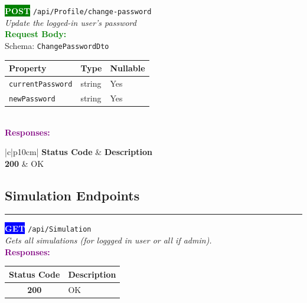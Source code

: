 \begin{tcolorbox}[
    colback=green!5,
    colframe=green,
    arc=2mm,
    boxrule=1pt,
    left=5pt,
    right=5pt,
    top=5pt,
    bottom=5pt
]
\noindent\colorbox{green}{\textcolor{white}{\textbf{POST}}} 
\texttt{\large /api/Profile/change-password}\\[0.3em]
\textit{Update the logged-in user's password}\\[0.3em]
\vspace{0.3em}
\textbf{\textcolor{green}{Request Body:}}\\[0.2em]
Schema: \texttt{ChangePasswordDto}\\[0.3em]
\begin{tabular}{|l|l|l|}
\hline
\rowcolor{green!10}
\textbf{Property} & \textbf{Type} & \textbf{Nullable} \\ \hline
\texttt{currentPassword} & string & Yes \\ \hline
\rowcolor{gray!5}
\texttt{newPassword} & string & Yes \\ \hline
\end{tabular}\\[0.5em]
\vspace{0.3em}
\textbf{\textcolor{purple}{Responses:}}\\[0.2em]
\begin{tabular}{|c|p{10cm}|}
\hline
{}
\textbf{Status Code} & \textbf{Description} \\ \hline
\colorbox{green!20}{\textbf{200}} & OK \\ \hline
\end{tabular}
\end{tcolorbox}
\vspace{0.5em}

\subsection{Simulation Endpoints}

\noindent\textcolor{gray!60}{\rule{\linewidth}{0.5pt}}
\vspace{0.5em}

\begin{tcolorbox}[
    colback=blue!5,
    colframe=blue,
    arc=2mm,
    boxrule=1pt,
    left=5pt,
    right=5pt,
    top=5pt,
    bottom=5pt
]
\noindent\colorbox{blue}{\textcolor{white}{\textbf{GET}}} 
\texttt{\large /api/Simulation}\\[0.3em]
\textit{Gets all simulations (for loggged in user or all if admin).}\\[0.3em]
\vspace{0.3em}
\textbf{\textcolor{purple}{Responses:}}\\[0.2em]
\begin{tabular}{|c|p{10cm}|}
\hline
\rowcolor{gray!20}
\textbf{Status Code} & \textbf{Description} \\ \hline
\colorbox{green!20}{\textbf{200}} & OK \\ \hline
\end{tabular}
\end{tcolorbox}
\vspace{0.5em}


